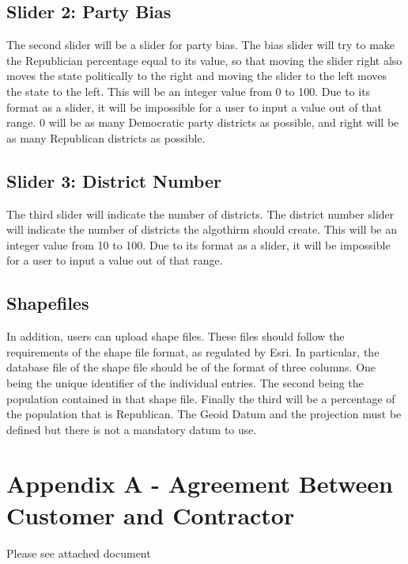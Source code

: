 \documentclass{article}
\begin{document}
\pagebreak

\subsection{Slider 2: Party Bias}

The second slider will be a slider for party bias.  The bias slider will try to make the Republician percentage equal to its value, so that moving the slider right also moves the state politically to the right and moving the slider to the left moves the state to the left.  This will be an integer value from 0 to 100. Due to its format as a slider, it will be impossible for a user to input a value out of that range.  0 will be as many Democratic party districts as possible, and right will be as many Republican districts as possible.



\subsection{Slider 3: District Number}

The third slider will indicate the number of districts.  The district number slider will indicate the number of districts the algothirm should create.  This will be an integer value from 10 to 100.  Due to its format as a slider, it will be impossible for a user to input a value out of that range.

\subsection{Shapefiles}

In addition, users can upload shape files.  These files should follow the requirements of the shape file format, as regulated by Esri.  In particular, the database file of the shape file should be of the format of three columns. One being the unique identifier of the individual entries. The second being the population contained in that shape file. Finally the third will be a percentage of the population that is Republican. The Geoid Datum  and the projection must be defined but there is not a mandatory datum to use.











\section{Appendix A - Agreement Between Customer and Contractor}
Please see attached document
\end{document}

